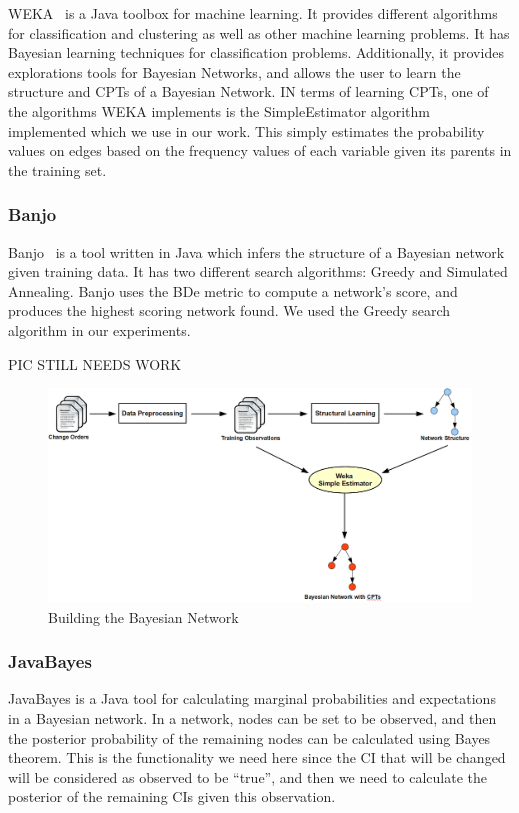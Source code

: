 \documentclass[10pt,twocolumn,letterpaper]{article}
\begin{document}
WEKA~\cite{hall2009weka} is a Java toolbox for machine learning. It provides different algorithms for classification and clustering as well as other machine
learning problems. It has Bayesian learning techniques for classification problems. Additionally, it provides explorations tools for Bayesian
Networks, and allows the user to learn the structure and CPTs of a Bayesian Network. IN terms of learning CPTs, one of the algorithms WEKA implements is
the SimpleEstimator algorithm~\cite{witten2005data} implemented which we use in our work. This simply estimates the probability values on edges based on
the frequency values of each variable given its parents in the training set.

\subsubsection{Banjo}
Banjo~\cite{banjotool} is a tool written in Java which infers the structure of a Bayesian network given training data. It has two different search algorithms:
Greedy and Simulated Annealing. Banjo uses the BDe metric to compute a network's score, and produces the highest scoring network found. We used the Greedy
search algorithm in our experiments.

PIC STILL NEEDS WORK

\begin{figure}[!t]
\centering
\includegraphics[width=15cm]{graphics/constructingmodel.png}
\caption{Building the Bayesian Network}
\label{fig:process}
\end{figure}

\subsubsection{JavaBayes}

JavaBayes is a Java tool for calculating marginal probabilities and expectations in a Bayesian network. In a network, nodes can be set to be observed, and then
the posterior probability of the remaining nodes can be calculated using Bayes theorem. This is the functionality we need here since the CI that will be
changed will be considered as observed to be ``true'', and then we need to calculate the posterior of the remaining CIs given this observation.
\end{document}
